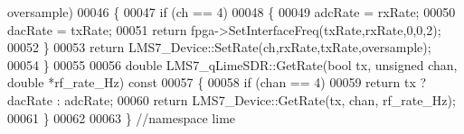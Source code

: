 \begin{DoxyCode}
      oversample)
00046 \{
00047     \textcolor{keywordflow}{if} (ch == 4)
00048     \{
00049         adcRate = rxRate;
00050         dacRate = txRate;
00051         \textcolor{keywordflow}{return} fpga->SetInterfaceFreq(txRate,rxRate,0,0,2);
00052     \}
00053     \textcolor{keywordflow}{return} LMS7_Device::SetRate(ch,rxRate,txRate,oversample);      
00054 \}
00055 
00056 \textcolor{keywordtype}{double} LMS7_qLimeSDR::GetRate(\textcolor{keywordtype}{bool} tx, \textcolor{keywordtype}{unsigned} chan, \textcolor{keywordtype}{double} *rf\_rate\_Hz)\textcolor{keyword}{ const}
00057 \textcolor{keyword}{}\{
00058     \textcolor{keywordflow}{if} (chan == 4)
00059         \textcolor{keywordflow}{return} tx ? dacRate : adcRate;
00060     \textcolor{keywordflow}{return} LMS7_Device::GetRate(tx, chan, rf\_rate\_Hz);
00061 \}
00062 
00063 \} \textcolor{comment}{//namespace lime}
\end{DoxyCode}
